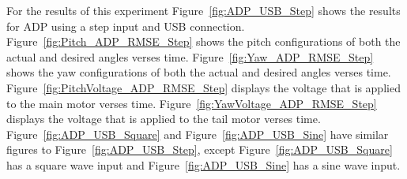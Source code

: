 For the results of this experiment Figure~\ref{fig:ADP_USB_Step} shows the results for ADP using a step input and USB connection.  Figure~\ref{fig:Pitch_ADP_RMSE_Step} shows the pitch configurations of both the actual and desired angles verses time.  Figure~\ref{fig:Yaw_ADP_RMSE_Step} shows the yaw configurations of both the actual and desired angles verses time.  Figure~\ref{fig:PitchVoltage_ADP_RMSE_Step} displays the voltage that is applied to the main motor verses time.  Figure~\ref{fig:YawVoltage_ADP_RMSE_Step} displays the voltage that is applied to the tail motor verses time.  Figure~\ref{fig:ADP_USB_Square} and Figure~\ref{fig:ADP_USB_Sine} have similar figures to Figure~\ref{fig:ADP_USB_Step}, except Figure~\ref{fig:ADP_USB_Square} has a square wave input and Figure~\ref{fig:ADP_USB_Sine} has a sine wave input.
\begin{figure}[!htbp]
    \centering
\end{figure}
